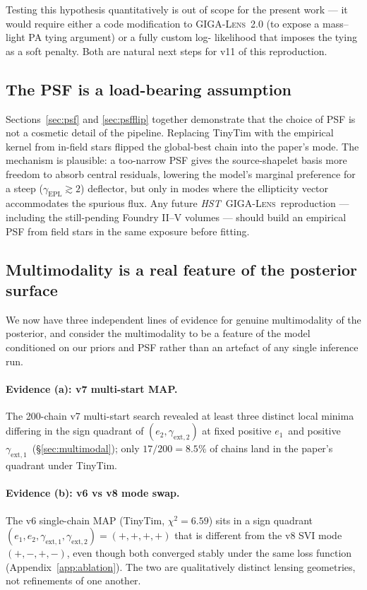 \documentclass[11pt,letterpaper]{article}
\newcommand{\gammaEPL}{\ensuremath{\gamma_{\mathrm{EPL}}}}
\newcommand{\gextone}{\ensuremath{\gamma_{\mathrm{ext},1}}}
\newcommand{\gexttwo}{\ensuremath{\gamma_{\mathrm{ext},2}}}
\newcommand{\eone}{\ensuremath{e_{1}}}
\newcommand{\etwo}{\ensuremath{e_{2}}}
\newcommand{\gigalens}{\textsc{GIGA-Lens}}
\begin{document}
Testing this hypothesis quantitatively is out of scope for the present
work --- it would require either a code modification to \gigalens\ 2.0
(to expose a mass--light PA tying argument) or a fully custom log-
likelihood that imposes the tying as a soft penalty. Both are natural
next steps for v11 of this reproduction.

\subsection{The PSF is a load-bearing assumption}

Sections~\ref{sec:psf} and \ref{sec:psfflip} together demonstrate that
the choice of PSF is not a cosmetic detail of the pipeline. Replacing
TinyTim with the empirical kernel from in-field stars flipped the
global-best chain into the paper's mode. The mechanism is plausible:
a too-narrow PSF gives the source-shapelet basis more freedom to
absorb central residuals, lowering the model's marginal preference
for a steep ($\gammaEPL\gtrsim 2$) deflector, but only in modes where
the ellipticity vector accommodates the spurious flux. Any future
{\it HST}\ \gigalens\ reproduction --- including the still-pending
Foundry II--V volumes --- should build an empirical PSF from field
stars in the same exposure before fitting.

\subsection{Multimodality is a real feature of the posterior surface}
\label{sec:multimodal_v11}

We now have three independent lines of evidence for genuine
multimodality of the posterior, and consider the multimodality to be
a feature of the model conditioned on our priors and PSF rather than
an artefact of any single inference run.

\paragraph{Evidence (a): v7 multi-start MAP.} The 200-chain v7
multi-start search revealed at least three distinct local minima
differing in the sign quadrant of $(\etwo,\gexttwo)$ at fixed positive
\eone\ and positive \gextone\ (\S\ref{sec:multimodal}); only $17/200
=8.5\%$ of chains land in the paper's quadrant under TinyTim.

\paragraph{Evidence (b): v6 vs v8 mode swap.} The v6 single-chain MAP
(TinyTim, $\chi^{2}=6.59$) sits in a sign quadrant
$(\eone,\etwo,\gextone,\gexttwo)=(+,+,+,+)$ that is different from the
v8 SVI mode $(+,-,+,-)$, even though both converged stably under the
same loss function (Appendix~\ref{app:ablation}). The two are
qualitatively distinct lensing geometries, not refinements of one
another.
\end{document}
